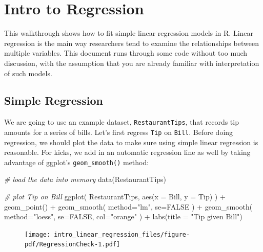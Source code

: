 \documentclass[
  letterpaper,
  DIV=11,
  numbers=noendperiod]{scrreprt}
\newenvironment{Shaded}{\begin{snugshade}}{\end{snugshade}}
\newcommand{\AttributeTok}[1]{\textcolor[rgb]{0.49,0.56,0.16}{#1}}
\newcommand{\CommentTok}[1]{\textcolor[rgb]{0.38,0.63,0.69}{\textit{#1}}}
\newcommand{\ConstantTok}[1]{\textcolor[rgb]{0.53,0.00,0.00}{#1}}
\newcommand{\FunctionTok}[1]{\textcolor[rgb]{0.02,0.16,0.49}{#1}}
\newcommand{\NormalTok}[1]{\textcolor[rgb]{0.00,0.44,0.13}{#1}}
\newcommand{\SpecialCharTok}[1]{\textcolor[rgb]{0.25,0.44,0.63}{#1}}
\newcommand{\StringTok}[1]{\textcolor[rgb]{0.25,0.44,0.63}{#1}}
\begin{document}
\hypertarget{intro-to-regression}{%
\chapter{Intro to Regression}\label{intro-to-regression}}

This walkthrough shows how to fit simple linear regression models in R.
Linear regression is the main way researchers tend to examine the
relationships between multiple variables. This document runs through
some code without too much discussion, with the assumption that you are
already familiar with interpretation of such models.

\hypertarget{simple-regression}{%
\section{Simple Regression}\label{simple-regression}}

We are going to use an example dataset, \texttt{RestaurantTips}, that
records tip amounts for a series of bills. Let's first regress
\texttt{Tip} on \texttt{Bill}. Before doing regression, we should plot
the data to make sure using simple linear regression is reasonable. For
kicks, we add in an automatic regression line as well by taking
advantage of ggplot's \texttt{geom\_smooth()} method:

\begin{Shaded}
\begin{Highlighting}[]
\CommentTok{\# load the data into memory}
\FunctionTok{data}\NormalTok{(RestaurantTips)}

\CommentTok{\# plot Tip on Bill}
\FunctionTok{ggplot}\NormalTok{( RestaurantTips, }\FunctionTok{aes}\NormalTok{(}\AttributeTok{x =}\NormalTok{ Bill, }\AttributeTok{y =}\NormalTok{ Tip) ) }\SpecialCharTok{+}
    \FunctionTok{geom\_point}\NormalTok{() }\SpecialCharTok{+}
    \FunctionTok{geom\_smooth}\NormalTok{( }\AttributeTok{method=}\StringTok{"lm"}\NormalTok{, }\AttributeTok{se=}\ConstantTok{FALSE}\NormalTok{ ) }\SpecialCharTok{+}
    \FunctionTok{geom\_smooth}\NormalTok{( }\AttributeTok{method=}\StringTok{"loess"}\NormalTok{, }\AttributeTok{se=}\ConstantTok{FALSE}\NormalTok{, }\AttributeTok{col=}\StringTok{"orange"}\NormalTok{ ) }\SpecialCharTok{+}
    \FunctionTok{labs}\NormalTok{(}\AttributeTok{title =} \StringTok{"Tip given Bill"}\NormalTok{)}
\end{Highlighting}
\end{Shaded}

\begin{figure}[H]

{\centering \texttt{[image: intro\_linear\_regression\_files/figure-pdf/RegressionCheck-1.pdf]}

}

\end{figure}
\end{document}
